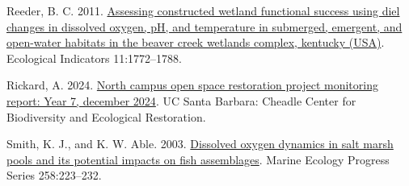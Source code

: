 \documentclass[
  letterpaper,
  DIV=11,
  numbers=noendperiod]{scrartcl}
\newlength{\cslhangindent}
\newenvironment{CSLReferences}[2] %
 {\begin{list}{}{%
  \setlength{\itemindent}{0pt}
  \setlength{\leftmargin}{0pt}
  \setlength{\parsep}{0pt}
  \ifodd #1
   \setlength{\leftmargin}{\cslhangindent}
   \setlength{\itemindent}{-1\cslhangindent}
  \fi
  \setlength{\itemsep}{#2\baselineskip}}}
 {\end{list}}
\begin{document}
\begin{CSLReferences}{1}{0}
Reeder, B. C. 2011.
\href{https://doi.org/10.1016/j.ecolind.2011.04.006}{Assessing
constructed wetland functional success using diel changes in dissolved
oxygen, pH, and temperature in submerged, emergent, and open-water
habitats in the beaver creek wetlands complex, kentucky (USA)}.
Ecological Indicators 11:1772--1788.

Rickard, A. 2024. \href{https://escholarship.org/uc/item/16p046mb}{North
campus open space restoration project monitoring report: Year 7,
december 2024}. UC Santa Barbara: Cheadle Center for Biodiversity and
Ecological Restoration.

Smith, K. J., and K. W. Able. 2003.
\href{https://doi.org/10.3354/meps258223}{Dissolved oxygen dynamics in
salt marsh pools and its potential impacts on fish assemblages}. Marine
Ecology Progress Series 258:223--232.

\end{CSLReferences}
\end{document}

